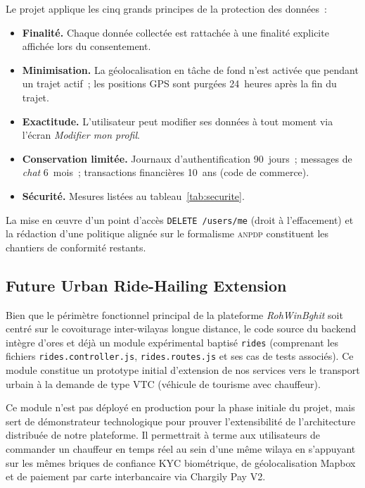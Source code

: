 \documentclass[12pt, a4paper, oneside]{report}
\begin{document}
Le projet applique les cinq grands principes de la protection des données~:
\begin{itemize}
  \item \textbf{Finalité.} Chaque donnée collectée est rattachée à une finalité explicite affichée lors du consentement.
  \item \textbf{Minimisation.} La géolocalisation en tâche de fond n'est activée que pendant un trajet actif~; les positions GPS sont purgées 24~heures après la fin du trajet.
  \item \textbf{Exactitude.} L'utilisateur peut modifier ses données à tout moment via l'écran \textit{Modifier mon profil}.
  \item \textbf{Conservation limitée.} Journaux d'authentification 90~jours~; messages de \textit{chat} 6~mois~; transactions financières 10~ans (code de commerce).
  \item \textbf{Sécurité.} Mesures listées au tableau~\ref{tab:securite}.
\end{itemize}

La mise en œuvre d'un point d'accès \texttt{DELETE /users/me} (droit à l'effacement) et la rédaction d'une politique alignée sur le formalisme \textsc{anpdp} constituent les chantiers de conformité restants.

\subsection{Future Urban Ride-Hailing Extension}
\label{sec:vtc-extension}

Bien que le périmètre fonctionnel principal de la plateforme \textit{RohWinBghit} soit centré sur le covoiturage inter-wilayas longue distance, le code source du backend intègre d'ores et déjà un module expérimental baptisé \texttt{rides} (comprenant les fichiers \texttt{rides.controller.js}, \texttt{rides.routes.js} et ses cas de tests associés). Ce module constitue un prototype initial d'extension de nos services vers le transport urbain à la demande de type VTC (véhicule de tourisme avec chauffeur). 

Ce module n'est pas déployé en production pour la phase initiale du projet, mais sert de démonstrateur technologique pour prouver l'extensibilité de l'architecture distribuée de notre plateforme. Il permettrait à terme aux utilisateurs de commander un chauffeur en temps réel au sein d'une même wilaya en s'appuyant sur les mêmes briques de confiance KYC biométrique, de géolocalisation Mapbox et de paiement par carte interbancaire via Chargily Pay V2.
\end{document}
